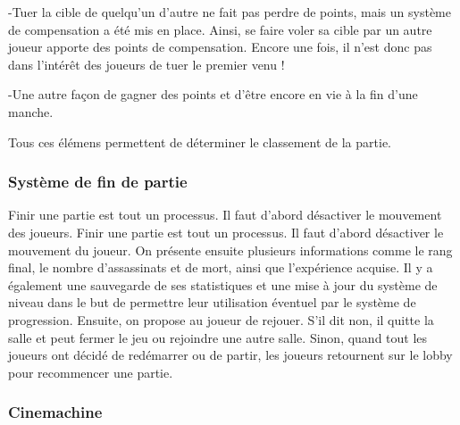 	-Tuer la cible de quelqu'un d'autre ne fait pas perdre de points, mais un système de compensation a été mis en place. Ainsi, se faire voler sa cible par un autre joueur apporte des points de compensation. Encore une fois, il n'est donc pas dans l'intérêt 
	des joueurs de tuer le premier venu !

	-Une autre façon de gagner des points et d'être encore en vie à la fin d'une manche.

    Tous ces élémens permettent de déterminer le classement de la partie.
	
\subsubsection{Système de fin de partie}
	Finir une partie est tout un processus. Il faut d'abord désactiver le mouvement des joueurs.
	Finir une partie est tout un processus. Il faut d'abord désactiver le mouvement du joueur.
	On présente ensuite plusieurs informations comme le rang final, le nombre d'assassinats
	et de mort, ainsi que l'expérience acquise. Il y a également une sauvegarde de ses statistiques et une mise à jour du système
	de niveau dans le but de permettre leur utilisation éventuel par le système de progression.
	Ensuite, on propose au joueur de rejouer. S'il dit non, il quitte la salle et peut fermer le jeu ou rejoindre une autre salle.
	Sinon, quand tout les joueurs ont décidé de redémarrer ou de partir, les joueurs retournent 
	sur le lobby pour recommencer une partie.

\subsubsection{Cinemachine}
